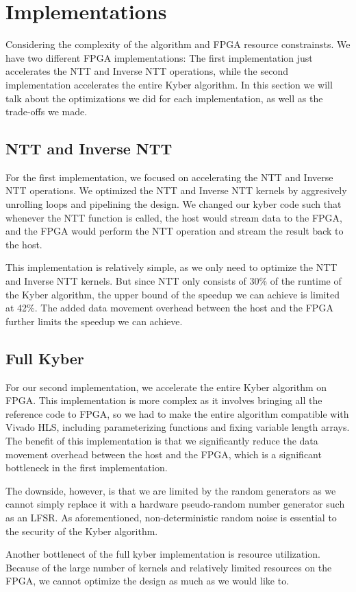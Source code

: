 
\section*{Implementations}

Considering the complexity of the algorithm and FPGA resource constrainsts.
We have two different FPGA implementations: The first implementation just accelerates the NTT and Inverse 
NTT operations, while the second implementation accelerates the entire Kyber algorithm. 
In this section we will talk about the optimizations we did for each implementation, as well as the trade-offs we made.

\subsection{NTT and Inverse NTT}
For the first implementation, we focused on accelerating the NTT and Inverse NTT operations. 
We optimized the NTT and Inverse NTT kernels by aggresively unrolling loops and pipelining the design.
We changed our kyber code such that whenever the NTT function is called, the host would stream data to the FPGA, 
and the FPGA would perform the NTT operation and stream the result back to the host.

This implementation is relatively simple, as we only need to optimize the NTT and Inverse NTT kernels. But since NTT 
only consists of 30\% of the runtime of the Kyber algorithm, the upper bound of the speedup we can achieve is limited
at 42\%. The added data movement overhead between the host and the FPGA further limits the speedup we can achieve.

\subsection{Full Kyber}
For our second implementation, we accelerate the entire Kyber algorithm on FPGA.
This implementation is more complex as it involves bringing all the reference code to FPGA, 
so we had to make the entire algorithm compatible with Vivado HLS, including parameterizing 
functions and fixing variable length arrays. The benefit of this implementation is that we significantly reduce the data
movement overhead between the host and the FPGA, which is a significant bottleneck in the first implementation.

The downside, however, is that we are limited by the random generators as we cannot simply replace it with a hardware
pseudo-random number generator such as an LFSR. As aforementioned, non-deterministic random noise is essential to the
security of the Kyber algorithm. 

Another bottlenect of the full kyber implementation is resource utilization. Because of the large number of kernels
and relatively limited resources on the FPGA,
we cannot optimize the design as much as we would like to. 